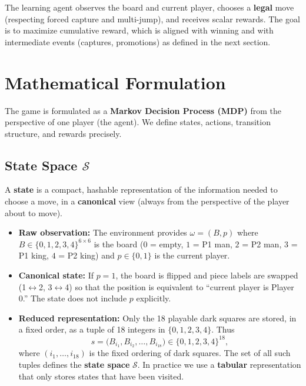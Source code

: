 \documentclass[11pt,a4paper]{article}
\begin{document}
The learning agent observes the board and current player, chooses a \textbf{legal} move (respecting forced capture and multi-jump), and receives scalar rewards. The goal is to maximize cumulative reward, which is aligned with winning and with intermediate events (captures, promotions) as defined in the next section.

\hrulefill

\section{Mathematical Formulation}

The game is formulated as a \textbf{Markov Decision Process (MDP)} from the perspective of one player (the agent). We define states, actions, transition structure, and rewards precisely.

\subsection{State Space $\mathcal{S}$}

A \textbf{state} is a compact, hashable representation of the information needed to choose a move, in a \textbf{canonical} view (always from the perspective of the player about to move).

\begin{itemize}[noitemsep]
  \item \textbf{Raw observation:} The environment provides $\omega = (B, p)$ where $B \in \{0,1,2,3,4\}^{6 \times 6}$ is the board ($0$ = empty, $1$ = P1 man, $2$ = P2 man, $3$ = P1 king, $4$ = P2 king) and $p \in \{0,1\}$ is the current player.
  \item \textbf{Canonical state:} If $p = 1$, the board is flipped and piece labels are swapped (1$\leftrightarrow$2, 3$\leftrightarrow$4) so that the position is equivalent to ``current player is Player 0.'' The state does not include $p$ explicitly.
  \item \textbf{Reduced representation:} Only the 18 playable dark squares are stored, in a fixed order, as a tuple of 18 integers in $\{0,1,2,3,4\}$. Thus
  \[
  s = \bigl( B_{i_1}, B_{i_2}, \ldots, B_{i_{18}} \bigr) \in \{0,1,2,3,4\}^{18},
  \]
  where $(i_1,\ldots,i_{18})$ is the fixed ordering of dark squares. The set of all such tuples defines the \textbf{state space} $\mathcal{S}$. In practice we use a \textbf{tabular} representation that only stores states that have been visited.
\end{itemize}
\end{document}
